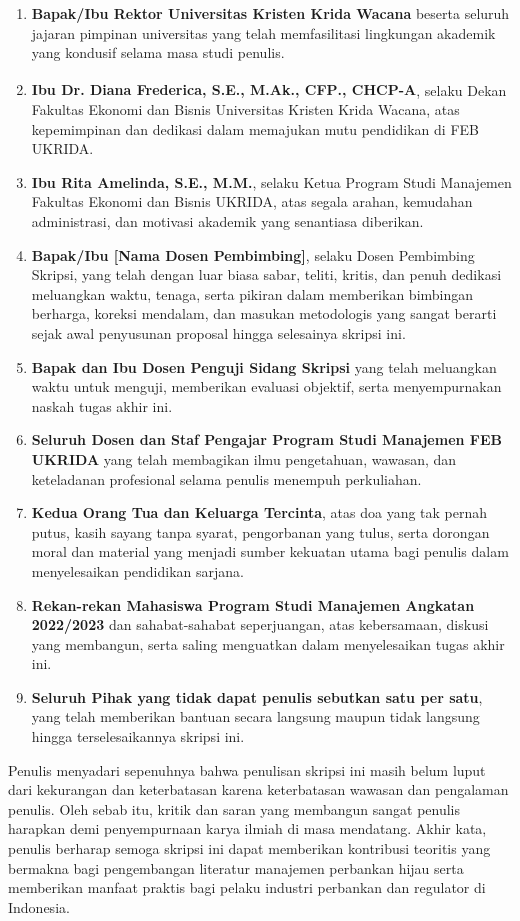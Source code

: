 \documentclass[12pt,a4paper]{article}
\newcommand{\dosbim}{[Nama Dosen Pembimbing]}
\numberwithin{equation}{section}
\begin{document}
\begin{enumerate}
  \item \textbf{Bapak/Ibu Rektor Universitas Kristen Krida Wacana} beserta seluruh jajaran pimpinan universitas yang telah memfasilitasi lingkungan akademik yang kondusif selama masa studi penulis.
  \item \textbf{Ibu Dr. Diana Frederica, S.E., M.Ak., CFP\textsuperscript{\textregistered}., CHCP-A}, selaku Dekan Fakultas Ekonomi dan Bisnis Universitas Kristen Krida Wacana, atas kepemimpinan dan dedikasi dalam memajukan mutu pendidikan di FEB UKRIDA.
  \item \textbf{Ibu Rita Amelinda, S.E., M.M.}, selaku Ketua Program Studi Manajemen Fakultas Ekonomi dan Bisnis UKRIDA, atas segala arahan, kemudahan administrasi, dan motivasi akademik yang senantiasa diberikan.
  \item \textbf{Bapak/Ibu \dosbim}, selaku Dosen Pembimbing Skripsi, yang telah dengan luar biasa sabar, teliti, kritis, dan penuh dedikasi meluangkan waktu, tenaga, serta pikiran dalam memberikan bimbingan berharga, koreksi mendalam, dan masukan metodologis yang sangat berarti sejak awal penyusunan proposal hingga selesainya skripsi ini.
  \item \textbf{Bapak dan Ibu Dosen Penguji Sidang Skripsi} yang telah meluangkan waktu untuk menguji, memberikan evaluasi objektif, serta menyempurnakan naskah tugas akhir ini.
  \item \textbf{Seluruh Dosen dan Staf Pengajar Program Studi Manajemen FEB UKRIDA} yang telah membagikan ilmu pengetahuan, wawasan, dan keteladanan profesional selama penulis menempuh perkuliahan.
  \item \textbf{Kedua Orang Tua dan Keluarga Tercinta}, atas doa yang tak pernah putus, kasih sayang tanpa syarat, pengorbanan yang tulus, serta dorongan moral dan material yang menjadi sumber kekuatan utama bagi penulis dalam menyelesaikan pendidikan sarjana.
  \item \textbf{Rekan-rekan Mahasiswa Program Studi Manajemen Angkatan 2022/2023} dan sahabat-sahabat seperjuangan, atas kebersamaan, diskusi yang membangun, serta saling menguatkan dalam menyelesaikan tugas akhir ini.
  \item \textbf{Seluruh Pihak yang tidak dapat penulis sebutkan satu per satu}, yang telah memberikan bantuan secara langsung maupun tidak langsung hingga terselesaikannya skripsi ini.
\end{enumerate}

\noindent
Penulis menyadari sepenuhnya bahwa penulisan skripsi ini masih belum luput dari kekurangan dan keterbatasan karena keterbatasan wawasan dan pengalaman penulis. Oleh sebab itu, kritik dan saran yang membangun sangat penulis harapkan demi penyempurnaan karya ilmiah di masa mendatang. Akhir kata, penulis berharap semoga skripsi ini dapat memberikan kontribusi teoritis yang bermakna bagi pengembangan literatur manajemen perbankan hijau serta memberikan manfaat praktis bagi pelaku industri perbankan dan regulator di Indonesia.
\end{document}
